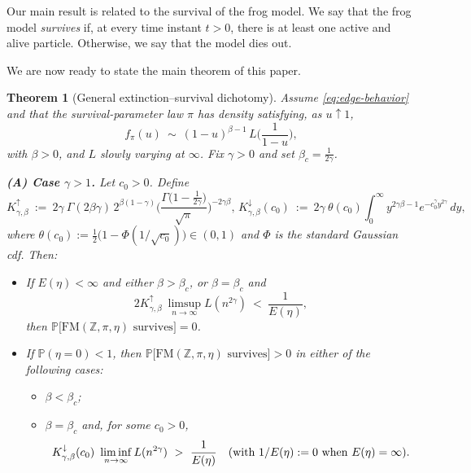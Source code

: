 \documentclass[preprint]{imsart}
\newcommand{\1}{\mathbf{1}}
\theoremstyle{plain}
\newtheorem{theorem}{Theorem}[section]
\theoremstyle{definition}
\begin{document}
Our main result is related to the survival of the frog model. We say that the frog model \emph{survives} if, at every time instant $t>0$, there is at least one active and alive particle. Otherwise, we say that the model dies out.

We are now ready to state the main theorem of this paper.

\begin{theorem}[General extinction–survival dichotomy]\label{thm:general-gamma}
Assume \eqref{eq:edge-behavior} and that the survival-parameter law $\pi$ has density satisfying, as $u\uparrow 1$,
\[
f_\pi(u)\ \sim\ (1-u)^{\beta-1}\,L\!\Big(\frac{1}{1-u}\Big),
\]
with $\beta>0$, and $L$ slowly varying at $\infty$. Fix $\gamma>0$ and set $\beta_c=\tfrac{1}{2\gamma}$.


\medskip
\noindent\textbf{(A) Case $\gamma>1$.} Let \(c_0>0\). Define
\[
K^{\uparrow}_{\gamma,\beta}\ :=\ 2\gamma\ \Gamma(2\beta\gamma)\,2^{\beta(1-\gamma)}
\Bigg(\frac{\Gamma\!\bigl(1-\tfrac{1}{2\gamma}\bigr)}{\sqrt{\pi}}\Bigg)^{-2\gamma\beta},
\,
K^{\downarrow}_{\gamma,\beta}(c_0)\ :=\ 2\gamma\ \theta(c_0)\!\int_{0}^{\infty}\! y^{2\gamma\beta-1}e^{-c_0^{\gamma}y^{2\gamma}}\,dy,
\]
where $\theta(c_0):=\tfrac12\bigl(1-\Phi(1/\sqrt{c_0})\bigr)\in(0,1)$ and $\Phi$ is the standard Gaussian cdf.
Then:
\begin{itemize}
\item[(i) \emph{Extinction.}] If $E(\eta)<\infty$ and either $\beta>\beta_c$, or $\beta=\beta_c$ and
\[
2K^{\uparrow}_{\gamma,\beta}\ \limsup_{n\to\infty} L(n^{2\gamma})\ <\ \frac{1}{E(\eta)},
\]
then $\mathbb{P}\big[\mathrm{FM}(\mathbb{Z},\pi,\eta)\text{ survives}\big]=0$.
\item[(ii) \emph{Survival.}] If $\mathbb{P}(\eta=0)<1$, then
$\mathbb{P}\big[\mathrm{FM}(\mathbb{Z},\pi,\eta)\text{ survives}\big]>0$ in either of the following cases:
\begin{itemize}
\item $\beta<\beta_c$;
\item $\beta=\beta_c$ and, for some $c_0>0$,
\[
K^{\downarrow}_{\gamma,\beta}(c_0)\ \liminf_{n\to\infty} L(n^{2\gamma})\ >\ \frac{1}{E(\eta)}
\quad \textup{(with $1/E(\eta):=0$ when $E(\eta)=\infty$)}.
\]
\end{itemize}
\end{itemize}


\end{theorem}
\end{document}
